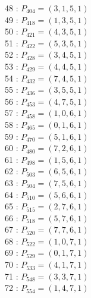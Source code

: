 \documentclass{article}
\begin{document}
{\begin{multicols}{3}
48 : $P_{404}=( 3, 1, 5, 1 )$\\
49 : $P_{418}=( 1, 3, 5, 1 )$\\
50 : $P_{421}=( 4, 3, 5, 1 )$\\
51 : $P_{422}=( 5, 3, 5, 1 )$\\
52 : $P_{428}=( 3, 4, 5, 1 )$\\
53 : $P_{429}=( 4, 4, 5, 1 )$\\
54 : $P_{432}=( 7, 4, 5, 1 )$\\
55 : $P_{436}=( 3, 5, 5, 1 )$\\
56 : $P_{453}=( 4, 7, 5, 1 )$\\
57 : $P_{458}=( 1, 0, 6, 1 )$\\
58 : $P_{465}=( 0, 1, 6, 1 )$\\
59 : $P_{470}=( 5, 1, 6, 1 )$\\
60 : $P_{480}=( 7, 2, 6, 1 )$\\
61 : $P_{498}=( 1, 5, 6, 1 )$\\
62 : $P_{503}=( 6, 5, 6, 1 )$\\
63 : $P_{504}=( 7, 5, 6, 1 )$\\
64 : $P_{510}=( 5, 6, 6, 1 )$\\
65 : $P_{515}=( 2, 7, 6, 1 )$\\
66 : $P_{518}=( 5, 7, 6, 1 )$\\
67 : $P_{520}=( 7, 7, 6, 1 )$\\
68 : $P_{522}=( 1, 0, 7, 1 )$\\
69 : $P_{529}=( 0, 1, 7, 1 )$\\
70 : $P_{533}=( 4, 1, 7, 1 )$\\
71 : $P_{548}=( 3, 3, 7, 1 )$\\
72 : $P_{554}=( 1, 4, 7, 1 )$\\
\end{multicols}


%


%


}%
\end{document}
